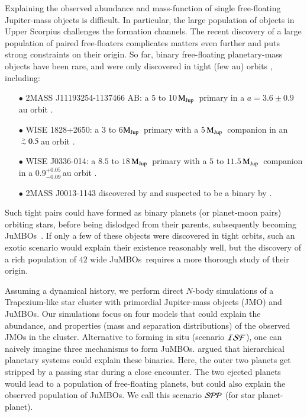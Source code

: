 \documentclass[submission,phys]{lib/SciPost}
\newcommand{\MJup}{\mbox{$\mathrm{{M}}_{\rm Jup}$}}
\def\apgt{\ {\raise-.5ex\hbox{$\buildrel>\over\sim$}}\ }
\newcommand{\jumbos}{\mbox{JuMBOs}}
\begin{document}
Explaining the observed abundance and mass-function of single
free-floating Jupiter-mass objects is difficult.  In particular, the
large population of objects in Upper Scorpius challenges the formation
channels. The recent discovery of a large population of paired
free-floaters complicates matters even further and puts strong
constraints on their origin. So far, binary free-floating
planetary-mass objects have been rare, and were only discovered in tight
(few au) orbits \cite{2021ApJS..253....7K}, including:  
\begin{itemize}
\item[$\bullet$]2MASS J11193254-1137466 AB: a $5$ to 10\,\MJup\,
  primary in a $a=3.6\pm0.9$\,au orbit \cite{2017ApJ...843L...4B}.
\item[$\bullet$]WISE 1828+2650: a 3 to 6\MJup\, primary with a
  5\,\MJup\ companion in an $\apgt 0.5$\,au orbit
  \cite{2013ApJ...764..101B}.
\item[$\bullet$] WISE J0336-014: a $8.5$ to
  $18$\,\MJup\ primary with a $5$ to $11.5$\,\MJup\, companion in a
  $0.9^{+0.05}_{-0.09}$\,au orbit \cite{2023ApJ...947L..30C}.
\item[$\bullet$]2MASS J0013-1143 discovered by \cite{2017AJ....154..112K} and
  suspected to be a binary by \cite{2019A&A...629A.145E}.
\end{itemize}

Such tight pairs could have formed as binary planets (or planet-moon
pairs) orbiting stars, before being dislodged from their parents,
subsequently becoming \jumbos\, \cite{2016ApJ...819..125C}.  If only a
few of these objects were discovered in tight orbits, such an exotic
scenario would explain their existence reasonably well, but the
discovery of a rich population of $42$ wide \jumbos\,
\cite{2023arXiv231001231P} requires a more thorough study of their
origin.

Assuming a dynamical history, we perform direct $N$-body simulations of a 
Trapezium-like star cluster with primordial Jupiter-mass objects (JMO) and \jumbos. 
Our simulations focus on four models that could explain the abundance,
and properties (mass and separation distributions) of the observed JMOs in the
cluster. Alternative to forming in situ (scenario ${\cal ISF}$), 
one can naively imagine three mechanisms to
form \jumbos. \cite{2023arXiv231006016W} argued that hierarchical planetary 
systems could explain these binaries. Here, the
outer two planets get stripped by a passing star during a close
encounter. The two ejected planets would lead to a population of free-floating planets, 
but could also explain the observed population of
\jumbos.  We call this scenario ${\cal SPP}$ (for star planet-planet).
\end{document}
